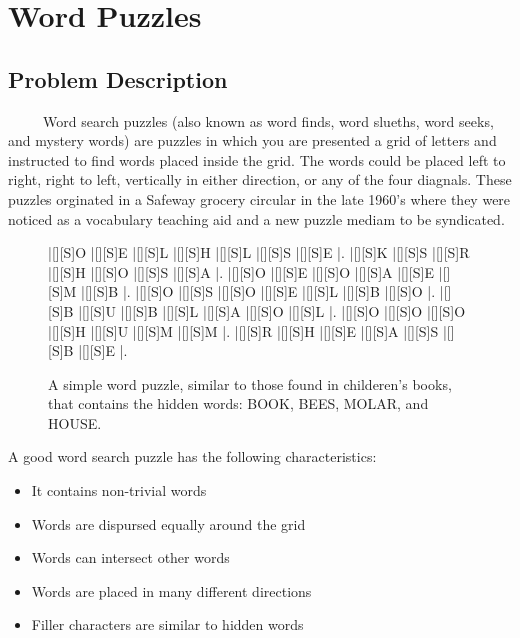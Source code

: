 \documentclass[12pt]{report}   %
\begin{document}
\chapter*{Word Puzzles}     %
    
\section*{Problem Description}       %

    \ \ \ \ \ Word search puzzles (also known as word finds, word slueths, word seeks,
    and mystery words) are puzzles in which you are presented a grid of letters
    and instructed to find words placed inside the grid. The words could be
    placed left to right, right to left, vertically in either direction, or
    any of the four diagnals. These puzzles orginated in a Safeway grocery
    circular in the late 1960's where they were noticed as a vocabulary
    teaching aid and a new puzzle mediam to be syndicated. \cite{wiki}
    \cite{justws}

    \vspace{12pt}

    \begin{SCfigure}
        \begin{Puzzle}{7}{7}
            |[][S]O |[][S]E |[][S]L |[][S]H |[][S]L |[][S]S |[][S]E |.
            |[][S]K |[][S]S |[][S]R |[][S]H |[][S]O |[][S]S |[][S]A |.
            |[][S]O |[][S]E |[][S]O |[][S]A |[][S]E |[][S]M |[][S]B |.
            |[][S]O |[][S]S |[][S]O |[][S]E |[][S]L |[][S]B |[][S]O |.
            |[][S]B |[][S]U |[][S]B |[][S]L |[][S]A |[][S]O |[][S]L |.
            |[][S]O |[][S]O |[][S]O |[][S]H |[][S]U |[][S]M |[][S]M |.
            |[][S]R |[][S]H |[][S]E |[][S]A |[][S]S |[][S]B |[][S]E |.
        \end{Puzzle}
        \caption{A simple word puzzle, similar to those found in childeren's
                 books, that contains the hidden words: BOOK, BEES, MOLAR, and
                 HOUSE.}
    \end{SCfigure}

    A good word search puzzle has the following characteristics:

    \begin{itemize}
        \item It contains non-trivial words
        \item Words are dispursed equally around the grid
        \item Words can intersect other words
        \item Words are placed in many different directions
        \item Filler characters are similar to hidden words
    \end{itemize}
\end{document}
